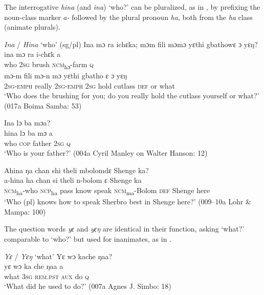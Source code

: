 The interrogative \textit{hina} (and \textit{ina}) ‘who?' can be pluralized, as in , by prefixing the noun-class marker \textit{a-} followed by the plural pronoun \textit{ha}, both from the \textit{ha} class (animate plurals).

\ea%
\label{bkm:who:60} \label{ex:60}
\textit{Ina} / \textit{Hina} ‘who' (sg/pl)
\ea\label{bkm:who:60a}  Ina mɔ ra ichɛka; mɔm fili mɔmɔ yɛthi gbathowɛ ɔ yɛŋ?\\
    \gll ina  mɔ  ra      i-chɛk      a\\
    who  \textsc{2sg}  brush    \textsc{ncm}\textsubscript{hɔ}{}-farm    \textsc{q}\\
    \gll mɔ-m      fili      mɔ-n      mɔ  yɛthi    gbatho  ɛ    ɔ  yɛŋ\\
    \textsc{2sg-}\textsc{emph}  really    \textsc{2sg}-\textsc{emph}  \textsc{2sg}  hold    cutlass  \textsc{def}  or  what\\
    \glt ‘Who does the brushing for you; do you really hold the cutlass yourself or what?' (017a Boima Samba: 53)

    \ex\label{bkm:who:60b}  Ina lɔ ba mɔa?\\
    \gll hina  lɔ    ba    mɔ  a\\
    who  \textsc{cop}  father    \textsc{2sg}  \textsc{q}\\
    \glt ‘Who is your father?' (004a Cyril Manley on Walter Hanson: 12)

    \ex\label{bkm:who:60c}\label{ex:60c}  Ahina ŋa chan shi theli mbolomdɛ Shenge ka?\\
    \gll a-hina    ha      chan  si    theli  n-bolom      ɛ    Shenge  ka\\
    \textsc{ncm}\textsubscript{ha}{}-who  \textsc{ncp}\textsubscript{ha}    pass  know  speak  \textsc{ncm}\textsubscript{ma}{}-Bolom  \textsc{def}  Shenge here\\
    \glt ‘Who (pl) knows how to speak Sherbro best in Shenge here?' (009--10a Lohr \& Mampa: 100)
    \z
    \z
    

The question words \textit{yɛ} and \textit{yɛŋ} are identical in their function, asking ‘what?' comparable to ‘who?' but used for inanimates, as in .

\ea%
    \label{ex:61} \textit{Yɛ} / \textit{Yɛŋ} ‘what' 
    \ea  Yɛ wɔ kache ŋaa?\\
    \gll yɛ    wɔ    ka      che  ŋaa  a\\
    what  \textsc{3sg}  \textsc{rem.pst}  \textsc{aux}  do    \textsc{q}\\
    \glt ‘What did he used to do?' (007a Agnes J. Simbo: 18)

